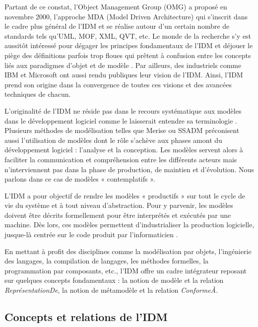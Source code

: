 Partant de ce constat, l'Object Management Group (OMG) a proposé en novembre 
2000, l'approche MDA (Model Driven Architecture) qui s'inscrit dans le cadre 
plus général de l'IDM et se réalise autour d'un certain nombre de standards tels 
qu'UML, MOF, XML, QVT, etc. Le monde de la recherche s'y est aussitôt intéressé 
pour dégager les principes fondamentaux de l'IDM 
\cite{bezivin2001towards}\cite{kent2002model} \cite{de2002using} et déjouer le 
piège des définitions parfois trop floues qui prêtent à confusion entre les 
concepts liés aux paradigmes d'objet et de modèle \cite{bezivin2004search}. Par 
ailleurs, des industriels comme IBM \cite{booch2004mda} et Microsoft 
\cite{greenfield2004software} ont aussi rendu publiques leur vision de l'IDM. 
Ainsi, l'IDM prend son origine dans la convergence de toutes ces visions et des 
avancées techniques de chacun.

L'originalité de l'IDM ne réside pas dans le recours systématique aux modèles 
dans le développement logiciel comme le laisserait entendre sa terminologie  
\cite{bezivin2004rapport}. Plusieurs méthodes de modélisation telles que Merise 
ou SSADM préconisent aussi l'utilisation de modèles dont le rôle s'achève aux 
phases amont du développement logiciel : l'analyse et la conception. Les modèles 
servent alors à faciliter la communication et compréhension entre les différents 
acteurs mais n'interviennent pas dans la phase de production, de maintien et 
d'évolution. Nous parlons dans ce cas de modèles « contemplatifs ». 

L'IDM a pour objectif de rendre les modèles « productifs » sur tout le cycle de 
vie du système et à tout niveau d'abstraction. Pour y parvenir, les modèles 
doivent être décrits formellement pour être interprétés et exécutés par une 
machine. Dès lors, ces modèles permettent d'industrialiser la production 
logicielle, jusque-là centrée sur le code produit par l'informaticien 
\cite{bezivin2005unification}.

En mettant à profit des disciplines comme la modélisation par objets, 
l'ingénierie des langages, la compilation de langages, les méthodes formelles, 
la programmation par composants, etc., l'IDM offre un cadre intégrateur reposant 
sur quelques concepts fondamentaux : la notion de modèle et la relation 
\textit{ReprésentationDe}, la notion de métamodèle et la relation 
\textit{ConformeÀ}.

\subsection{Concepts et relations de l'IDM}
